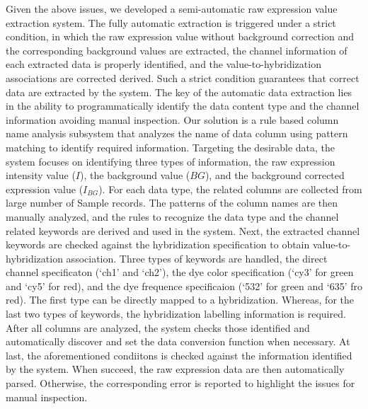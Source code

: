 Given the above issues, we developed a semi-automatic raw expression value
extraction system.
%
The fully automatic extraction is triggered under a strict condition, in which
the raw expression value without background correction and the corresponding
background values are extracted, the channel information of each extracted
data is properly identified, and the value-to-hybridization associations are
corrected derived.
%
Such a strict condition guarantees that correct data are extracted by the
system.
%
The key of the automatic data extraction lies in the ability to
programmatically identify the data content type and the channel information
avoiding manual inspection.
%
Our solution is a rule based column name analysis subsystem that analyzes the
name of data column using pattern matching to identify required information.
%
Targeting the desirable data, the system focuses on identifying three types of
information, the raw expression intensity value ($I$), the background value
($BG$), and the background corrected expression value ($I_{BG}$).
%
For each data type, the related columns are collected from large number of
Sample records.  The patterns of the column names are then manually analyzed,
and the rules to recognize the data type and the channel related keywords are
derived and used in the system.
%
Next, the extracted channel keywords are checked against the hybridization
specification to obtain value-to-hybridization association.
%
Three types of keywords are handled, the direct channel specificaton (`ch1'
and `ch2'), the dye color specification (`cy3' for green and `cy5' for red),
and the dye frequence specificaion (`532' for green and `635' fro red).
%
The first type can be directly mapped to a hybridization.  Whereas, for the
last two types of keywords, the hybridization labelling information is
required.
%
After all columns are analyzed, the system checks those identified and
automatically discover and set the data conversion function when necessary.
%
At last, the aforementioned condiitons is checked against the information
identified by the system.
%
When succeed, the raw expression data are then automatically parsed.
Otherwise, the corresponding error is reported to highlight the issues for
manual inspection.
%
%







